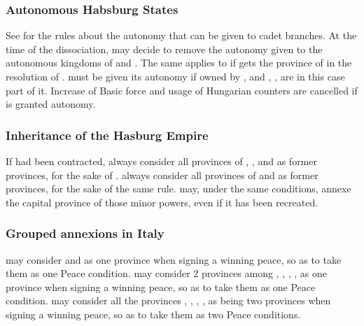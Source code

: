\subsubsection{Autonomous Habsburg States}
\aparag See  for the rules about
the autonomy that can be given to cadet branches.
\aparag At the time of the dissociation, \HAB may decide to remove the
autonomy given to the autonomous kingdoms of  and
. The same applies to  if \HAB gets the
province of  in the resolution of
.
\aparag[Sicilia]  must be given its autonomy if owned by \HAB, and
, ,  are in this
case part of it.
\aparag[Hungary] Increase of Basic force and usage of Hungarian counters
are cancelled if  is granted autonomy.

\subsubsection{Inheritance of the Hasburg Empire}
\aparag If  had been contracted, \HAB
always consider all provinces of ,
,  and
 as former provinces, for the sake of
.
\aparag \HAB  always consider all provinces of  
and  as  former
provinces, for the sake of the same rule.
\aparag \HAB may, under the same conditions, annexe the capital province of
those minor powers, even if it has been recreated.

\subsubsection{Grouped annexions in Italy}
\aparag \HAB may consider  and 
as one province when signing a winning peace, so as to take them as one
Peace condition.
\aparag \HAB may consider 2 provinces among ,
, , ,
 as one province when signing a winning peace, so as
to take them as one Peace condition.
\aparag \HAB may consider all the provinces ,
, , ,
 as being two provinces when signing a winning peace,
so as to take them as two Peace conditions.



